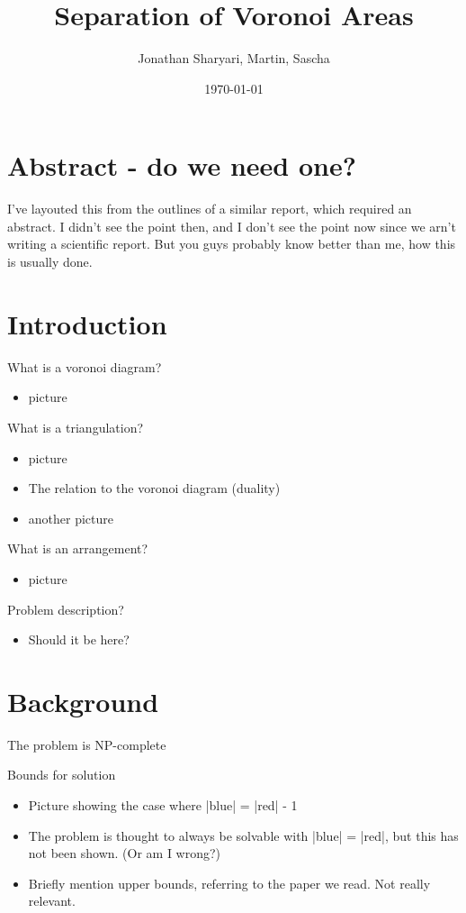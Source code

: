 \documentclass[a4paper,12pt]{article}
\title{\textbf{Separation of Voronoi Areas}}
\author{Jonathan Sharyari, Martin, Sascha}  %
\date{\today}
\begin{document}
\maketitle

\section{Abstract - do we need one?}
I've layouted this from the outlines of a similar report, which required an abstract. I didn't see the point then, and I don't see the point now since we arn't writing a scientific report. But you guys probably know better than me, how this is usually done.


\section{Introduction}
What is a voronoi diagram?
\begin{itemize}
\item
	picture
\end{itemize}
What is a triangulation?
\begin{itemize}
\item
	picture
\item
	The relation to the voronoi diagram (duality)
\item
	another picture
\end{itemize}

What is an arrangement?
\begin{itemize}
\item
	picture
\end{itemize}

Problem description?

\begin{itemize}
\item
	Should it be here? 
\end{itemize}
\section{Background}
The problem is NP-complete

Bounds for solution
\begin{itemize}
\item
	Picture showing the case where |blue| = |red| - 1
\item
	The problem is thought to always be solvable with |blue| = |red|, but this has not been shown. (Or am I wrong?)
\item
	Briefly mention upper bounds, referring to the paper we read. Not really relevant.
\end{itemize}
\end{document}
